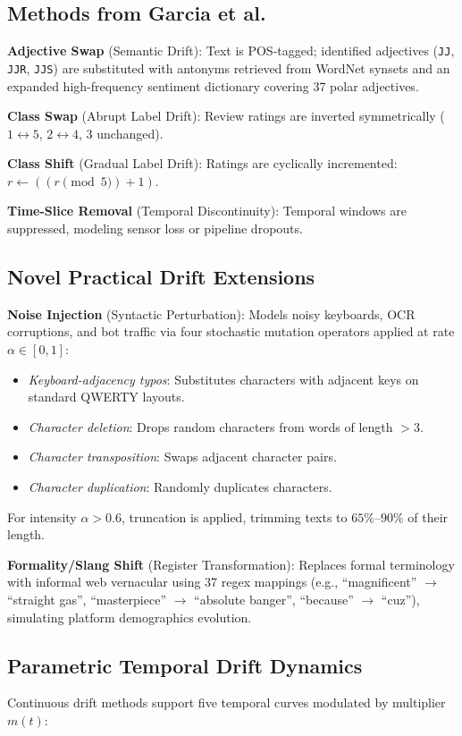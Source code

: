 \documentclass[conference]{IEEEtran}
\begin{document}
\subsection{Methods from Garcia et al.~\cite{garcia2024methods}}
\textbf{Adjective Swap} (Semantic Drift): Text is POS-tagged; identified adjectives (\texttt{JJ}, \texttt{JJR}, \texttt{JJS}) are substituted with antonyms retrieved from WordNet synsets and an expanded high-frequency sentiment dictionary covering 37 polar adjectives.

\textbf{Class Swap} (Abrupt Label Drift): Review ratings are inverted symmetrically ($1 \leftrightarrow 5$, $2 \leftrightarrow 4$, 3 unchanged).

\textbf{Class Shift} (Gradual Label Drift): Ratings are cyclically incremented: $r \leftarrow ((r \pmod 5) + 1)$.

\textbf{Time-Slice Removal} (Temporal Discontinuity): Temporal windows are suppressed, modeling sensor loss or pipeline dropouts.

\subsection{Novel Practical Drift Extensions}
\textbf{Noise Injection} (Syntactic Perturbation): Models noisy keyboards, OCR corruptions, and bot traffic via four stochastic mutation operators applied at rate $\alpha \in [0, 1]$:
\begin{itemize}
    \item \textit{Keyboard-adjacency typos}: Substitutes characters with adjacent keys on standard QWERTY layouts.
    \item \textit{Character deletion}: Drops random characters from words of length $> 3$.
    \item \textit{Character transposition}: Swaps adjacent character pairs.
    \item \textit{Character duplication}: Randomly duplicates characters.
\end{itemize}
For intensity $\alpha > 0.6$, truncation is applied, trimming texts to $65\%$--$90\%$ of their length.

\textbf{Formality/Slang Shift} (Register Transformation): Replaces formal terminology with informal web vernacular using 37 regex mappings (e.g., ``magnificent'' $\rightarrow$ ``straight gas'', ``masterpiece'' $\rightarrow$ ``absolute banger'', ``because'' $\rightarrow$ ``cuz''), simulating platform demographics evolution.

\subsection{Parametric Temporal Drift Dynamics}
Continuous drift methods support five temporal curves modulated by multiplier $m(t)$:
\end{document}
